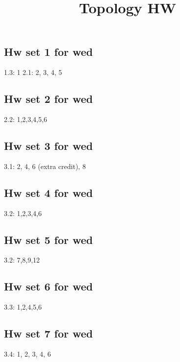 \documentclass{amsart}
\numberwithin{equation}{section}
\theoremstyle{definition}
\theoremstyle{remark}
\begin{document}
\title{Topology HW}
\maketitle
\subsection*{Hw set 1 for wed}
1.3: 1  
2.1: 2, 3, 4, 5  
\subsection*{Hw set 2 for wed}
2.2: 1,2,3,4,5,6
\subsection*{Hw set 3 for wed}
3.1: 2, 4, 6 (extra credit), 8
\subsection*{Hw set 4 for wed}
3.2: 1,2,3,4,6
\subsection*{Hw set 5 for wed}
3.2: 7,8,9,12
\subsection*{Hw set 6 for wed}
3.3: 1,2,4,5,6   
\subsection*{Hw set 7 for wed}
3.4: 1, 2, 3, 4, 6
\end{document}
